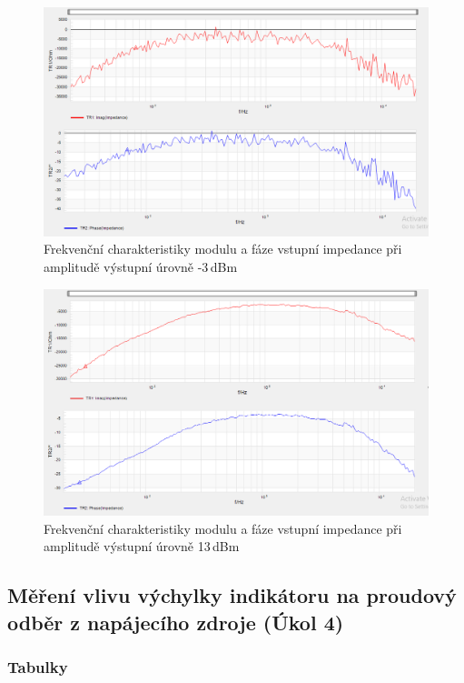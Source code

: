 \documentclass[a4paper, czech]{article}
\begin{document}
\begin{figure}[H]
    \centering
    \includegraphics[width=\textwidth]{impedance_uloha8.png}
    \caption{Frekvenční charakteristiky modulu a fáze vstupní impedance při amplitudě výstupní úrovně -3\,dBm}
\end{figure}

\begin{figure}[H]
    \centering
    \includegraphics[width=\textwidth]{impedance_13dbm_uloha8.png}
    \caption{Frekvenční charakteristiky modulu a fáze vstupní impedance při amplitudě výstupní úrovně 13\,dBm}
\end{figure}

\subsection{Měření vlivu výchylky indikátoru na proudový odběr z napájecího zdroje (Úkol 4)}

\subsubsection{Tabulky}
\end{document}
